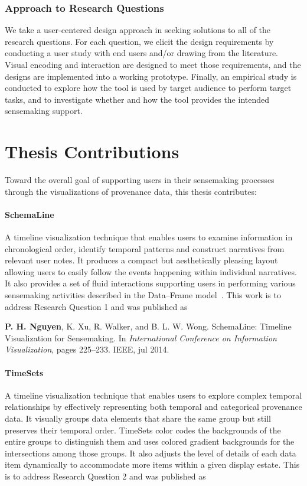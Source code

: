 \subsubsection*{\textbf{Approach to Research Questions}}
We take a user-centered design approach in seeking solutions to all of the research questions. For each question, we elicit the design requirements by conducting a user study with end users and/or drawing from the literature. Visual encoding and interaction are designed to meet those requirements, and the designs are implemented into a working prototype. Finally, an empirical study is conducted to explore how the tool is used by target audience to perform target tasks, and to investigate whether and how the tool provides the intended sensemaking support.

\section{Thesis Contributions}
Toward the overall goal of supporting users in their sensemaking processes through the visualizations of provenance data, this thesis contributes:

\paragraph{SchemaLine} A timeline visualization technique that enables users to examine information in chronological order, identify temporal patterns and construct narratives from relevant user notes. It produces a compact but aesthetically pleasing layout allowing users to easily follow the events happening within individual narratives. It also provides a set of fluid interactions supporting users in performing various sensemaking activities described in the Data--Frame model~\cite{Klein2003}. This work is to address Research Question 1 and was published as

\textbf{P. H. Nguyen}, K. Xu, R. Walker, and B. L. W. Wong. SchemaLine: Timeline Visualization for Sensemaking. In \textit{International Conference on Information Visualization}, pages 225--233. IEEE, jul 2014.

\paragraph{TimeSets} A timeline visualization technique that enables users to explore complex temporal relationships by effectively representing both temporal and categorical provenance data. It visually groups data elements that share the same group but still preserves their temporal order. TimeSets color codes the backgrounds of the entire groups to distinguish them and uses colored gradient backgrounds for the intersections among those groups. It also adjusts the level of details of each data item dynamically to accommodate more items within a given display estate. This is to address Research Question 2 and was published as

